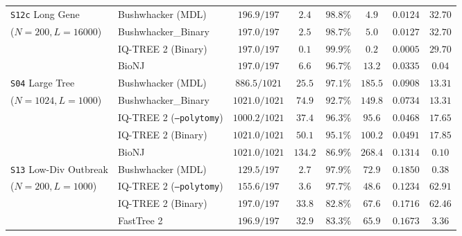 \documentclass[11pt,a4paper]{article}
\begin{document}
\begin{table}[t!]
{\begin{tabular}{@{}llcccccc@{}}
\addlinespace
\texttt{S12c} Long Gene & Bushwhacker (MDL) & $196.9 / 197$ & $2.4$ & $98.8\%$ & $4.9$ & $0.0124$ & $32.70$ \\
($N=200, L=16000$) & Bushwhacker\_Binary & $197.0 / 197$ & $2.5$ & $98.7\%$ & $5.0$ & $0.0127$ & $32.70$ \\
& IQ-TREE 2 (Binary) & $197.0 / 197$ & $0.1$ & $99.9\%$ & $0.2$ & $0.0005$ & $29.70$ \\
& BioNJ & $197.0 / 197$ & $6.6$ & $96.7\%$ & $13.2$ & $0.0335$ & $0.04$ \\
\addlinespace
\texttt{S04} Large Tree & Bushwhacker (MDL) & $886.5 / 1021$ & $25.5$ & $97.1\%$ & $185.5$ & $0.0908$ & $13.31$ \\
($N=1024, L=1000$) & Bushwhacker\_Binary & $1021.0 / 1021$ & $74.9$ & $92.7\%$ & $149.8$ & $0.0734$ & $13.31$ \\
& IQ-TREE 2 (\texttt{--polytomy}) & $1000.2 / 1021$ & $37.4$ & $96.3\%$ & $95.6$ & $0.0468$ & $17.65$ \\
& IQ-TREE 2 (Binary) & $1021.0 / 1021$ & $50.1$ & $95.1\%$ & $100.2$ & $0.0491$ & $17.85$ \\
& BioNJ & $1021.0 / 1021$ & $134.2$ & $86.9\%$ & $268.4$ & $0.1314$ & $0.10$ \\
\addlinespace
\texttt{S13} Low-Div Outbreak & Bushwhacker (MDL) & $129.5 / 197$ & $2.7$ & $97.9\%$ & $72.9$ & $0.1850$ & $0.38$ \\
($N=200, L=1000$) & IQ-TREE 2 (\texttt{--polytomy}) & $155.6 / 197$ & $3.6$ & $97.7\%$ & $48.6$ & $0.1234$ & $62.91$ \\
& IQ-TREE 2 (Binary) & $197.0 / 197$ & $33.8$ & $82.8\%$ & $67.6$ & $0.1716$ & $62.46$ \\
& FastTree 2 & $196.9 / 197$ & $32.9$ & $83.3\%$ & $65.9$ & $0.1673$ & $3.36$ \\
\bottomrule
\end{tabular}%
}
\end{table}
\end{document}
